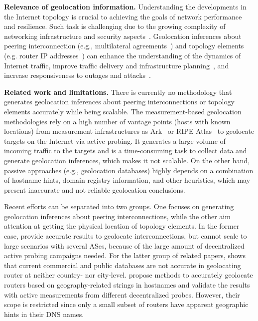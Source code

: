	\textbf{Relevance of geolocation information.} Understanding the developments in the Internet topology is crucial to achieving the goals of network performance and resilience. Such task is challenging due to the growing complexity of networking infrastructure and security aspects~\cite{Giotsas:2015:MPI:2716281.2836122}. Geolocation inferences about peering interconnection (e.g., multilateral agreements~\cite{Giotsas:2013}) and topology elements (e.g. router IP addresses~\cite{8002903,Huffaker:2014:DDR:2656877.2656879}) can enhance the understanding of the dynamics of Internet traffic, improve traffic delivery and infrastructure planning~\cite{Calder:2013:MEG:2504730.2504754}, and increase responsiveness to outages and attacks~\cite{Giotsas:2017:DPI:3098822.3098855, marcos:2018:dynamix}. 


	\textbf{Related work and limitations.} There is currently no methodology that generates geolocation inferences about peering interconnections or topology elements accurately while being scalable. The measurement-based geolocation methodologies rely on a high number of vantage points (hosts with known locations) from measurement infrastructures as Ark~\cite{ark} or RIPE Atlas~\cite{ripeatlas} to geolocate targets on the Internet via active probing. It generates a large volume of incoming traffic to the targets and is a time-consuming task to collect data and generate geolocation inferences, which makes it not scalable. On the other hand, passive approaches (e.g., geolocation databases) highly depends on a combination of hostname hints, domain registry information, and other heuristics, which may present inaccurate and not reliable geolocation conclusions.

	Recent efforts can be separated into two groups. One focuses on generating geolocation inferences about peering interconnections, while the other aim attention at getting the physical location of topology elements. In the former case, \cite{Giotsas:2015:MPI:2716281.2836122, Augustin:2009:IM:1644893.1644934} provide accurate results to geolocate interconnections, but cannot scale to large scenarios with several ASes, because of the large amount of decentralized active probing campaigns needed. For the latter group of related papers, \cite{Gharaibeh:2017:LRG:3131365.3131380} shows that current commercial and public databases are not accurate in geolocating router at neither country- nor city-level. \cite{Huffaker:2014:DDR:2656877.2656879, 8002903} propose methods to accurately geolocate routers based on geography-related strings in hostnames and validate the results with active measurements from different decentralized probes. However, their scope is restricted since only a small subset of routers have apparent geographic hints in their DNS names.

